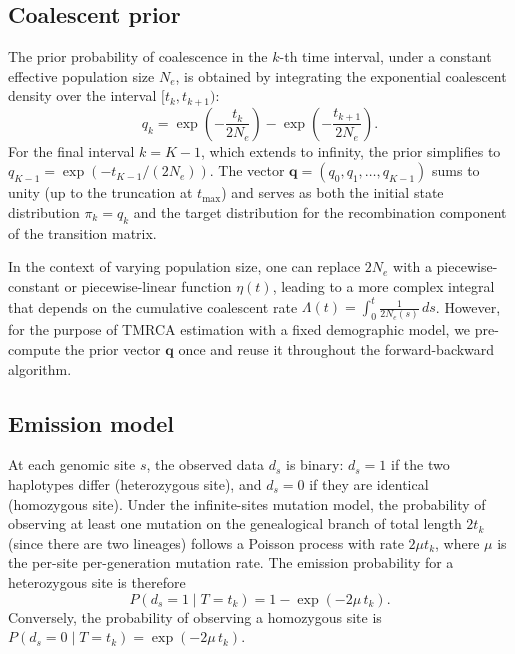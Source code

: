 \documentclass[10pt,letterpaper]{article}
\begin{document}
\subsection{Coalescent prior}

The prior probability of coalescence in the $k$-th time interval, under a constant effective population size $N_e$, is obtained by integrating the exponential coalescent density over the interval $[t_k, t_{k+1})$:
\begin{equation}
q_k = \exp\!\left(-\frac{t_k}{2N_e}\right) - \exp\!\left(-\frac{t_{k+1}}{2N_e}\right).
\label{eq:coalescent_prior}
\end{equation}
For the final interval $k = K-1$, which extends to infinity, the prior simplifies to $q_{K-1} = \exp(-t_{K-1}/(2N_e))$. The vector $\mathbf{q} = (q_0, q_1, \ldots, q_{K-1})$ sums to unity (up to the truncation at $t_{\max}$) and serves as both the initial state distribution $\pi_k = q_k$ and the target distribution for the recombination component of the transition matrix.

In the context of varying population size, one can replace $2N_e$ with a piecewise-constant or piecewise-linear function $\eta(t)$, leading to a more complex integral that depends on the cumulative coalescent rate $\Lambda(t) = \int_0^t \frac{1}{2N_e(s)}\,ds$. However, for the purpose of TMRCA estimation with a fixed demographic model, we pre-compute the prior vector $\mathbf{q}$ once and reuse it throughout the forward-backward algorithm.

\subsection{Emission model}

At each genomic site $s$, the observed data $d_s$ is binary: $d_s = 1$ if the two haplotypes differ (heterozygous site), and $d_s = 0$ if they are identical (homozygous site). Under the infinite-sites mutation model, the probability of observing at least one mutation on the genealogical branch of total length $2t_k$ (since there are two lineages) follows a Poisson process with rate $2\mu t_k$, where $\mu$ is the per-site per-generation mutation rate. The emission probability for a heterozygous site is therefore
\begin{equation}
P(d_s = 1 \mid T = t_k) = 1 - \exp(-2\mu\, t_k).
\label{eq:emission_het}
\end{equation}
Conversely, the probability of observing a homozygous site is $P(d_s = 0 \mid T = t_k) = \exp(-2\mu\, t_k)$.
\end{document}
